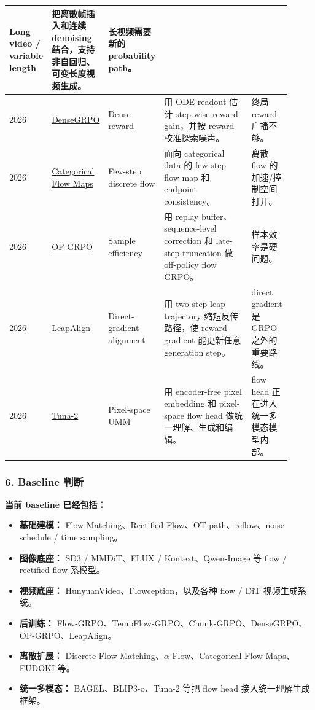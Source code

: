 {\begin{longtable}{p{0.08\linewidth} p{0.20\linewidth} p{0.16\linewidth} p{0.33\linewidth} p{0.14\linewidth}}
Long video / variable length &
把离散帧插入和连续 denoising 结合，支持非自回归、可变长度视频生成。 &
长视频需要新的 probability path。 \\
\midrule
2026 &
\href{https://arxiv.org/abs/2601.20218}{DenseGRPO} &
Dense reward &
用 ODE readout 估计 step-wise reward gain，并按 reward 校准探索噪声。 &
终局 reward 广播不够。 \\
\midrule
2026 &
\href{https://arxiv.org/abs/2602.12233}{Categorical Flow Maps} &
Few-step discrete flow &
面向 categorical data 的 few-step flow map 和 endpoint consistency。 &
离散 flow 的加速/控制空间打开。 \\
\midrule
2026 &
\href{https://arxiv.org/abs/2604.04142}{OP-GRPO} &
Sample efficiency &
用 replay buffer、sequence-level correction 和 late-step truncation 做 off-policy flow GRPO。 &
样本效率是硬问题。 \\
\midrule
2026 &
\href{https://arxiv.org/abs/2604.15311}{LeapAlign} &
Direct-gradient alignment &
用 two-step leap trajectory 缩短反传路径，使 reward gradient 能更新任意 generation step。 &
direct gradient 是 GRPO 之外的重要路线。 \\
\midrule
2026 &
\href{https://arxiv.org/abs/2604.24763}{Tuna-2} &
Pixel-space UMM &
用 encoder-free pixel embedding 和 pixel-space flow head 做统一理解、生成和编辑。 &
flow head 正在进入统一多模态模型内部。 \\
\bottomrule
\end{longtable}
}

\subsubsection*{6. Baseline 判断}

\textbf{当前 baseline 已经包括：}

\begin{itemize}[leftmargin=1.5em]
  \item \textbf{基础建模：} Flow Matching、Rectified Flow、OT path、reflow、noise schedule / time sampling。
  \item \textbf{图像底座：} SD3 / MMDiT、FLUX / Kontext、Qwen-Image 等 flow / rectified-flow 系模型。
  \item \textbf{视频底座：} HunyuanVideo、Flowception，以及各种 flow / DiT 视频生成系统。
  \item \textbf{后训练：} Flow-GRPO、TempFlow-GRPO、Chunk-GRPO、DenseGRPO、OP-GRPO、LeapAlign。
  \item \textbf{离散扩展：} Discrete Flow Matching、$\alpha$-Flow、Categorical Flow Maps、FUDOKI 等。
  \item \textbf{统一多模态：} BAGEL、BLIP3-o、Tuna-2 等把 flow head 接入统一理解生成框架。
\end{itemize}

